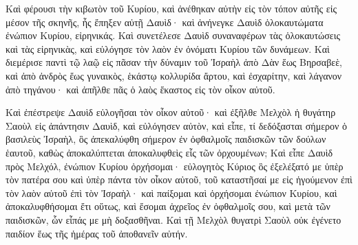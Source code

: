 {\par }{\PP {}Καὶ φέρουσι τὴν κιβωτὸν τοῦ Κυρίου, καὶ ἀνέθηκαν αὐτὴν εἰς τὸν τόπον αὐτῆς εἰς μέσον τῆς σκηνῆς, ἧς ἔπηξεν αὐτῇ Δαυὶδ· καὶ ἀνήνεγκε Δαυὶδ ὁλοκαυτώματα ἐνώπιον Κυρίου, εἰρηνικάς.
Καὶ συνετέλεσε Δαυὶδ συναναφέρων τὰς ὁλοκαυτώσεις καὶ τὰς εἰρηνικὰς, καὶ εὐλόγησε τὸν λαὸν ἐν ὀνόματι Κυρίου τῶν δυνάμεων.
Καὶ διεμέρισε παντὶ τῷ λαῷ εἰς πᾶσαν τὴν δύναμιν τοῦ Ἰσραὴλ ἀπὸ Δὰν ἕως Βηρσαβεὲ, καὶ ἀπὸ ἀνδρὸς ἕως γυναικὸς, ἑκάστῳ κολλυρίδα ἄρτου, καὶ ἐσχαρίτην, καὶ λάγανον ἀπὸ τηγάνου· καὶ ἀπῆλθε πᾶς ὁ λαὸς ἕκαστος εἰς τὸν οἶκον αὐτοῦ.
\par }{\PP {}Καὶ ἐπέστρεψε Δαυὶδ εὐλογῆσαι τὸν οἶκον αὐτοῦ· καὶ ἐξῆλθε Μελχὸλ ἡ θυγάτηρ Σαοὺλ εἰς ἀπάντησιν Δαυὶδ, καὶ εὐλόγησεν αὐτὸν, καὶ εἶπε, τί δεδόξασται σήμερον ὁ βασιλεὺς Ἰσραὴλ, ὃς ἀπεκαλύφθη σήμερον ἐν ὀφθαλμοῖς παιδισκῶν τῶν δούλων ἑαυτοῦ, καθὼς ἀποκαλύπτεται ἀποκαλυφθεὶς εἷς τῶν ὀρχουμένων;
Καὶ εἶπε Δαυὶδ πρὸς Μελχόλ, ἐνώπιον Κυρίου ὀρχήσομαι· εὐλογητὸς Κύριος ὃς ἐξελέξατό με ὑπὲρ τὸν πατέρα σου καὶ ὑπὲρ πάντα τὸν οἶκον αὐτοῦ, τοῦ καταστῆσαί με εἰς ἡγούμενον ἐπὶ τὸν λαὸν αὐτοῦ ἐπὶ τὸν Ἰσραὴλ·
καὶ παίξομαι καὶ ὀρχήσομαι ἐνώπιον Κυρίου, καὶ ἀποκαλυφθήσομαι ἔτι οὕτως, καὶ ἔσομαι ἀχρεῖος ἐν ὀφθαλμοῖς σου, καὶ μετὰ τῶν παιδισκῶν, ὧν εἶπάς με μὴ δοξασθῆναι.
Καὶ τῇ Μελχὸλ θυγατρὶ Σαοὺλ οὐκ ἐγένετο παιδίον ἕως τῆς ἡμέρας τοῦ ἀποθανεῖν αὐτήν.

}
